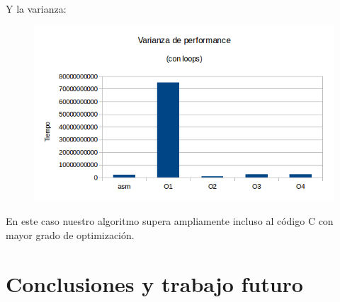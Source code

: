 \documentclass[a4paper]{article}
\begin{document}
Y la varianza:

\begin{figure}[h!]
  \begin{center}
  \includegraphics[scale=0.66]{Graficos1.4/ban/VSO.png}
  \label{nombreparareferenciar12}
  \end{center}
\end{figure}

En este caso nuestro algoritmo supera ampliamente incluso al código C con mayor grado de optimización.


\section{Conclusiones y trabajo futuro}
\end{document}
